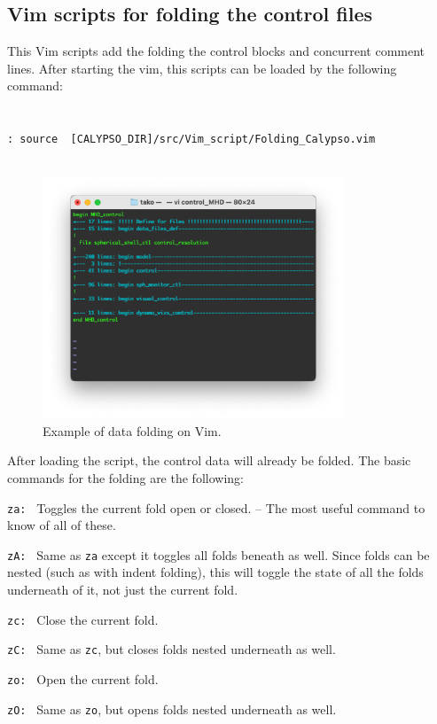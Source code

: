\subsection{Vim scripts for folding the control files}
This Vim scripts add the folding the control blocks and concurrent comment lines.
After starting the vim, this scripts can be loaded by the following command: \\
\\
\\
\verb|: source  [CALYPSO_DIR]/src/Vim_script/Folding_Calypso.vim|
\\
\\
%
\begin{figure}[htbp]
\begin{center}
\includegraphics*[width=90mm]{Images/vim_folding}
\end{center}
\caption{Example of data folding on Vim.}
\label{fig:vim_folding}
\end{figure}
%
After loading the script, the control data will already be folded. The basic commands for the folding are the following:
%
\begin{description}
\item{\tt za: } Toggles the current fold open or closed. – The most useful command to know of all of these.
\item{\tt zA: }  Same as \verb|za| except it toggles all folds beneath as well. Since folds can be nested (such as with indent folding), this will toggle the state of all the folds underneath of it, not just the current fold.
\item{\tt zc: } Close the current fold.
\item{\tt zC: } Same as \verb|zc|, but closes folds nested underneath as well.
\item{\tt zo: } Open the current fold.
\item{\tt zO: } Same as \verb|zo|, but opens folds nested underneath as well.
\end{description}
%

